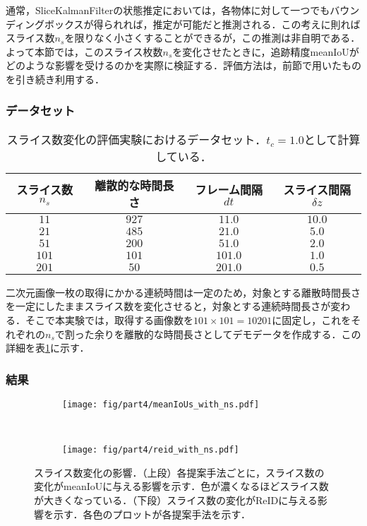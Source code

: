 通常，SliceKalmanFilterの状態推定においては，各物体に対して一つでもバウンディングボックスが得られれば，推定が可能だと推測される．この考えに則ればスライス数$n_s$を限りなく小さくすることができるが，この推測は非自明である．よって本節では，このスライス枚数$n_s$を変化させたときに，追跡精度meanIoUがどのような影響を受けるのかを実際に検証する．評価方法は，前節で用いたものを引き続き利用する．

    \subsubsection{データセット}

    \begin{table}[t]
        \centering
        \caption[スライス数変化の評価実験におけるデータセット]{スライス数変化の評価実験におけるデータセット．$t_c = 1.0$として計算している．}
        \label{tab:ns_exp_detail}
        \begin{tabular}{c|ccc}
            スライス数$n_s$ & 離散的な時間長さ & フレーム間隔$dt$ & スライス間隔$\delta z$ 
            \\ \hline \hline
            $11$ & $927$ & $11.0$ & $10.0$
            \\ $21$ & $485$ & $21.0$ & $5.0$
            \\ $51$ & $200$ & $51.0$ & $2.0$
            \\ $101$ & $101$ & $101.0$ & $1.0$
            \\ $201$ & $50$ & $201.0$ & $0.5$
        \end{tabular}
    \end{table}

    二次元画像一枚の取得にかかる連続時間は一定のため，対象とする離散時間長さを一定にしたままスライス数を変化させると，対象とする連続時間長さが変わる．そこで本実験では，取得する画像数を$101 \times 101 = 10201$に固定し，これをそれぞれの$n_s$で割った余りを離散的な時間長さとしてデモデータを作成する．この詳細を表\ref{tab:ns_exp_detail}に示す．

    \subsubsection{結果}

    \begin{figure}[t]
        \begin{subfigure}[t]{\linewidth}
            \centering
            \texttt{[image: fig/part4/meanIoUs\_with\_ns.pdf]}
        \end{subfigure}
        \\
        \begin{subfigure}[t]{\linewidth}
            \centering
            \texttt{[image: fig/part4/reid\_with\_ns.pdf]}
        \end{subfigure}
        \caption[スライス数変化の影響]{スライス数変化の影響．（上段）各提案手法ごとに，スライス数の変化がmeanIoUに与える影響を示す．色が濃くなるほどスライス数が大きくなっている．（下段）スライス数の変化がReIDに与える影響を示す．各色のプロットが各提案手法を示す．}
        \label{fig:ns_effect}
    \end{figure}

